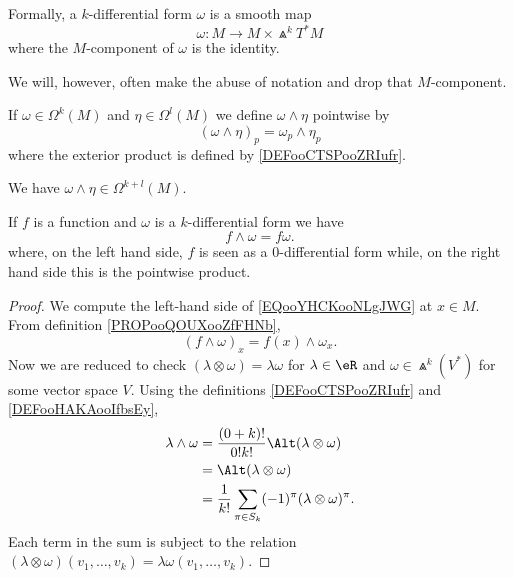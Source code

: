 \begin{normaltext}
	Formally, a \( k\)-differential form \( \omega\) is a smooth map
	\begin{equation}
		\omega \colon M\to M\times \Wedge^kT^*M
	\end{equation}
	where the \( M\)-component of \( \omega\) is the identity.

	We will, however, often make the abuse of notation and drop that \( M\)-component.
\end{normaltext}

\begin{propositionDef}		\label{PROPooQOUXooZfFHNb}
	If \( \omega\in \Omega^k(M)\) and \( \eta\in \Omega^l(M)\) we define \( \omega\wedge \eta\) pointwise by
	\begin{equation}
		(\omega\wedge \eta)_p=\omega_p\wedge \eta_p
	\end{equation}
	where the exterior product is defined by \ref{DEFooCTSPooZRIufr}.

	We have \( \omega\wedge\eta\in\Omega^{k+l}(M)\).
\end{propositionDef}

\begin{lemma}		\label{LEMooUVRQooVZDKir}
	If \( f\) is a function and \( \omega\) is a \( k\)-differential form we have
	\begin{equation}		\label{EQooYHCKooNLgJWG}
		f\wedge \omega=f\omega.
	\end{equation}
	where, on the left hand side, \( f\) is seen as a \( 0\)-differential form while, on the right hand side this is the pointwise product.
\end{lemma}

\begin{proof}
	We compute the left-hand side of \eqref{EQooYHCKooNLgJWG} at \( x\in M\). From definition \ref{PROPooQOUXooZfFHNb},
	\begin{equation}
		(f\wedge \omega)_x=f(x)\wedge \omega_x.
	\end{equation}
	Now we are reduced to check \( (\lambda\otimes \omega)=\lambda\omega\) for \( \lambda\in \eR\) and \( \omega\in \Wedge^k(V^*)\) for some vector space \( V\). Using the definitions \ref{DEFooCTSPooZRIufr} and \ref{DEFooHAKAooIfbsEy},
	\begin{subequations}
		\begin{align}
			\lambda\wedge \omega & =\frac{ (0+k)! }{ 0!k! }\Alt(\lambda\otimes \omega)                    \\
			                     & =\Alt(\lambda\otimes \omega)                                           \\
			                     & =\frac{1}{ k!}\sum_{\pi\in S_k}(-1)^{\pi}(\lambda\otimes\omega)^{\pi}.
		\end{align}
	\end{subequations}
	Each term in the sum is subject to the relation \( (\lambda\otimes \omega)(v_1,\ldots,v_k)=\lambda\omega(v_1,\ldots,v_k)\).
\end{proof}

